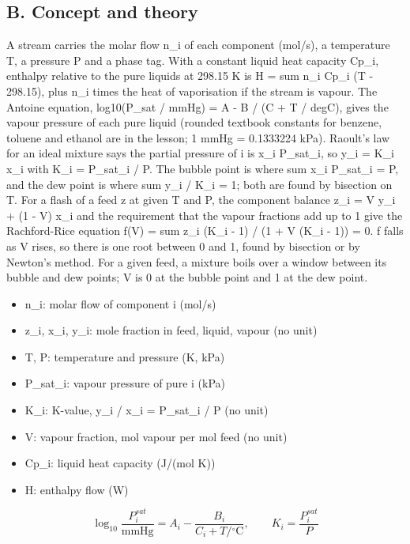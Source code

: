 \documentclass[11pt,a4paper]{article}
\begin{document}
\subsection*{B. Concept and theory}
A stream carries the molar flow n\_i of each component (mol/s), a temperature T, a pressure P and a phase tag. With a constant liquid heat capacity Cp\_i, enthalpy relative to the pure liquids at 298.15 K is H = sum n\_i Cp\_i (T - 298.15), plus n\_i times the heat of vaporisation if the stream is vapour. The Antoine equation, log10(P\_sat / mmHg) = A - B / (C + T / degC), gives the vapour pressure of each pure liquid (rounded textbook constants for benzene, toluene and ethanol are in the lesson; 1 mmHg = 0.1333224 kPa). Raoult's law for an ideal mixture says the partial pressure of i is x\_i P\_sat\_i, so y\_i = K\_i x\_i with K\_i = P\_sat\_i / P. The bubble point is where sum x\_i P\_sat\_i = P, and the dew point is where sum y\_i / K\_i = 1; both are found by bisection on T. For a flash of a feed z at given T and P, the component balance z\_i = V y\_i + (1 - V) x\_i and the requirement that the vapour fractions add up to 1 give the Rachford-Rice equation f(V) = sum z\_i (K\_i - 1) / (1 + V (K\_i - 1)) = 0. f falls as V rises, so there is one root between 0 and 1, found by bisection or by Newton's method. For a given feed, a mixture boils over a window between its bubble and dew points; V is 0 at the bubble point and 1 at the dew point.

\begin{itemize}[nosep]
\item n\_i: molar flow of component i (mol/s)
\item z\_i, x\_i, y\_i: mole fraction in feed, liquid, vapour (no unit)
\item T, P: temperature and pressure (K, kPa)
\item P\_sat\_i: vapour pressure of pure i (kPa)
\item K\_i: K-value, y\_i / x\_i = P\_sat\_i / P (no unit)
\item V: vapour fraction, mol vapour per mol feed (no unit)
\item Cp\_i: liquid heat capacity (J/(mol K))
\item H: enthalpy flow (W)
\end{itemize}

\begin{equation*}
\log_{10}\frac{P^{sat}_i}{\mathrm{mmHg}}=A_i-\frac{B_i}{C_i+T/{}^\circ\mathrm{C}},\qquad K_i=\frac{P^{sat}_i}{P}
\end{equation*}
\end{document}
